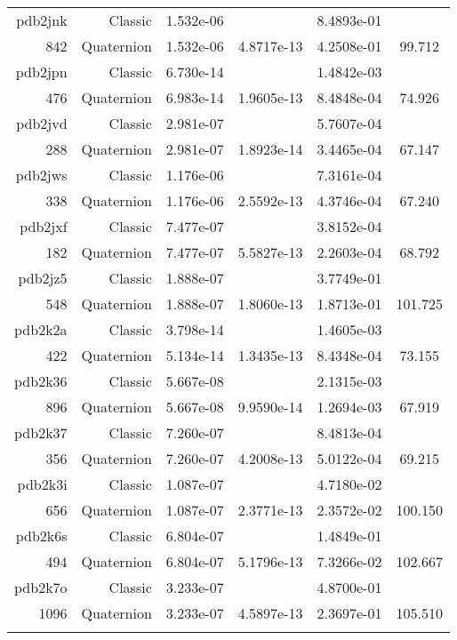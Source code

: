 \begin{xltabular}{\textwidth}{r|rS[table-format=1.3e+2]S[table-format=1.4e+2]S[table-format=1.4e+2]S[table-format=-1.3]}
pdb2jnk & Classic & 1.532e-06 &  & 8.4893e-01 & \\
842 & Quaternion & 1.532e-06 & 4.8717e-13 & 4.2508e-01 & 99.712\\  \addlinespace
pdb2jpn & Classic & 6.730e-14 &  & 1.4842e-03 & \\
476 & Quaternion & 6.983e-14 & 1.9605e-13 & 8.4848e-04 & 74.926\\  \addlinespace
pdb2jvd & Classic & 2.981e-07 &  & 5.7607e-04 & \\
288 & Quaternion & 2.981e-07 & 1.8923e-14 & 3.4465e-04 & 67.147\\  \addlinespace
pdb2jws & Classic & 1.176e-06 &  & 7.3161e-04 & \\
338 & Quaternion & 1.176e-06 & 2.5592e-13 & 4.3746e-04 & 67.240\\  \addlinespace
pdb2jxf & Classic & 7.477e-07 &  & 3.8152e-04 & \\
182 & Quaternion & 7.477e-07 & 5.5827e-13 & 2.2603e-04 & 68.792\\  \addlinespace
pdb2jz5 & Classic & 1.888e-07 &  & 3.7749e-01 & \\
548 & Quaternion & 1.888e-07 & 1.8060e-13 & 1.8713e-01 & 101.725\\  \addlinespace
pdb2k2a & Classic & 3.798e-14 &  & 1.4605e-03 & \\
422 & Quaternion & 5.134e-14 & 1.3435e-13 & 8.4348e-04 & 73.155\\  \addlinespace
pdb2k36 & Classic & 5.667e-08 &  & 2.1315e-03 & \\
896 & Quaternion & 5.667e-08 & 9.9590e-14 & 1.2694e-03 & 67.919\\  \addlinespace
pdb2k37 & Classic & 7.260e-07 &  & 8.4813e-04 & \\
356 & Quaternion & 7.260e-07 & 4.2008e-13 & 5.0122e-04 & 69.215\\  \addlinespace
pdb2k3i & Classic & 1.087e-07 &  & 4.7180e-02 & \\
656 & Quaternion & 1.087e-07 & 2.3771e-13 & 2.3572e-02 & 100.150\\  \addlinespace
pdb2k6s & Classic & 6.804e-07 &  & 1.4849e-01 & \\
494 & Quaternion & 6.804e-07 & 5.1796e-13 & 7.3266e-02 & 102.667\\  \addlinespace
pdb2k7o & Classic & 3.233e-07 &  & 4.8700e-01 & \\
1096 & Quaternion & 3.233e-07 & 4.5897e-13 & 2.3697e-01 & 105.510\\  \addlinespace

\end{xltabular}

